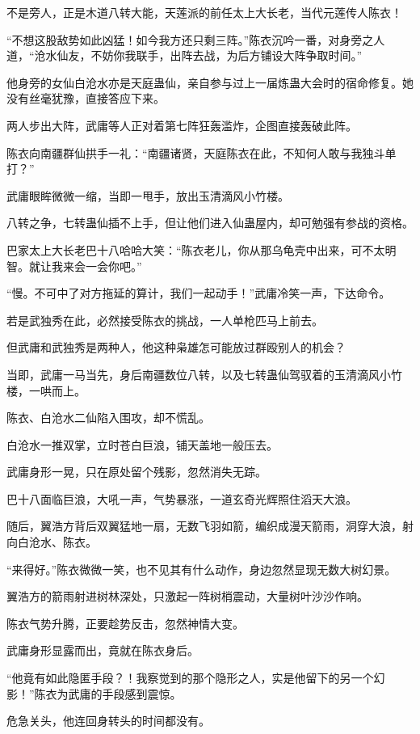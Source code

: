 \begin{this_body}
不是旁人，正是木道八转大能，天莲派的前任太上大长老，当代元莲传人陈衣！

“不想这股敌势如此凶猛！如今我方还只剩三阵。”陈衣沉吟一番，对身旁之人道，“沧水仙友，不妨你我联手，出阵去战，为后方铺设大阵争取时间。”

他身旁的女仙白沧水亦是天庭蛊仙，亲自参与过上一届炼蛊大会时的宿命修复。她没有丝毫犹豫，直接答应下来。

两人步出大阵，武庸等人正对着第七阵狂轰滥炸，企图直接轰破此阵。

陈衣向南疆群仙拱手一礼：“南疆诸贤，天庭陈衣在此，不知何人敢与我独斗单打？”

武庸眼眸微微一缩，当即一甩手，放出玉清滴风小竹楼。

八转之争，七转蛊仙插不上手，但让他们进入仙蛊屋内，却可勉强有参战的资格。

巴家太上大长老巴十八哈哈大笑：“陈衣老儿，你从那乌龟壳中出来，可不太明智。就让我来会一会你吧。”

“慢。不可中了对方拖延的算计，我们一起动手！”武庸冷笑一声，下达命令。

若是武独秀在此，必然接受陈衣的挑战，一人单枪匹马上前去。

但武庸和武独秀是两种人，他这种枭雄怎可能放过群殴别人的机会？

当即，武庸一马当先，身后南疆数位八转，以及七转蛊仙驾驭着的玉清滴风小竹楼，一哄而上。

陈衣、白沧水二仙陷入围攻，却不慌乱。

白沧水一推双掌，立时苍白巨浪，铺天盖地一般压去。

武庸身形一晃，只在原处留个残影，忽然消失无踪。

巴十八面临巨浪，大吼一声，气势暴涨，一道玄奇光辉照住滔天大浪。

随后，翼浩方背后双翼猛地一扇，无数飞羽如箭，编织成漫天箭雨，洞穿大浪，射向白沧水、陈衣。

“来得好。”陈衣微微一笑，也不见其有什么动作，身边忽然显现无数大树幻景。

翼浩方的箭雨射进树林深处，只激起一阵树梢震动，大量树叶沙沙作响。

陈衣气势升腾，正要趁势反击，忽然神情大变。

武庸身形显露而出，竟就在陈衣身后。

“他竟有如此隐匿手段？！我察觉到的那个隐形之人，实是他留下的另一个幻影！”陈衣为武庸的手段感到震惊。

危急关头，他连回身转头的时间都没有。


\end{this_body}
